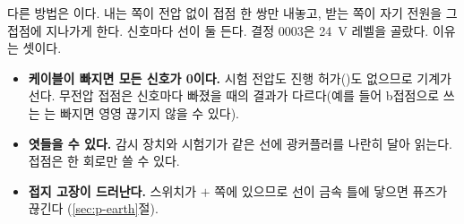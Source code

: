 다른 방법은 이다. 내는 쪽이 전압 없이 접점 한 쌍만 내놓고, 받는 쪽이 자기 전원을
그 접점에 지나가게 한다. 신호마다 선이 둘 든다. 결정 0003은 24~V 레벨을 골랐다. 이유는 셋이다.
\begin{itemize}
\item \textbf{케이블이 빠지면 모든 신호가 0이다.} 시험 전압도 진행 허가()도 없으므로 기계가 선다. 무전압
접점은 신호마다 빠졌을 때의 결과가 다르다(예를 들어 b접점으로 쓰는 는 빠지면 영영 끊기지 않을 수 있다).
\item \textbf{엿들을 수 있다.} 감시 장치와 시험기가 같은 선에 광커플러를 나란히 달아 읽는다. 접점은 한 회로만 쓸
수 있다.
\item \textbf{접지 고장이 드러난다.} 스위치가 $+$ 쪽에 있으므로 선이 금속 틀에 닿으면 퓨즈가 끊긴다
(\ref{sec:p-earth}절).
\end{itemize}

